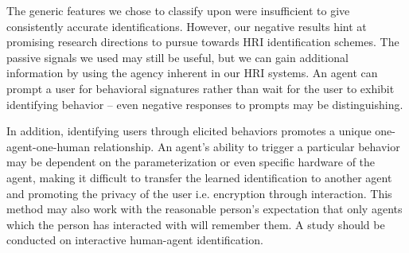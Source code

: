 \documentclass[conference]{IEEEtran}
\begin{document}
The generic features we chose to classify upon were insufficient to give consistently accurate identifications. However, our negative results hint at promising research directions to pursue towards HRI identification schemes. The passive signals we used may still be useful, but we can gain additional information by using the agency inherent in our HRI systems. An agent can prompt a user for behavioral signatures rather than wait for the user to exhibit identifying behavior -- even negative responses to prompts may be distinguishing. 

In addition, identifying users through elicited behaviors promotes a unique one-agent-one-human relationship. An agent's ability to trigger a particular behavior may be dependent on the parameterization or even specific hardware of the agent, making it difficult to transfer the learned identification to another agent and promoting the privacy of the user i.e. encryption through interaction. This method may also work with the reasonable person's expectation that only agents which the person has interacted with will remember them. A study should be conducted on interactive human-agent identification. 





\end{document}
